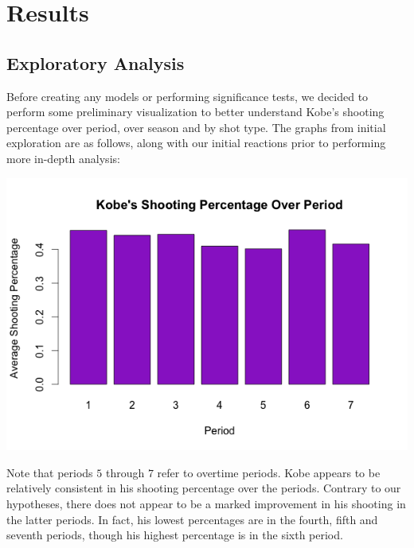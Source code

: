 \documentclass[paper=a4, fontsize=11pt]{scrartcl} %
\numberwithin{equation}{section} %
\numberwithin{figure}{section} %
\numberwithin{table}{section} %
\begin{document}
\section{Results}
\subsection{Exploratory Analysis}
Before creating any models or performing significance tests, we decided to perform some preliminary visualization to better understand Kobe's shooting percentage over period, over season and by shot type. The graphs from initial exploration are as follows, along with our initial reactions prior to performing more in-depth analysis:
\begin{center}
	\includegraphics[width=14cm]{img/period}
\end{center}
Note that periods $5$ through $7$ refer to overtime periods. Kobe appears to be relatively consistent in his shooting percentage over the periods. Contrary to our hypotheses, there does not appear to be a marked improvement in his shooting in the latter periods. In fact, his lowest percentages are in the fourth, fifth and seventh periods, though his highest percentage is in the sixth period.  
\end{document}
